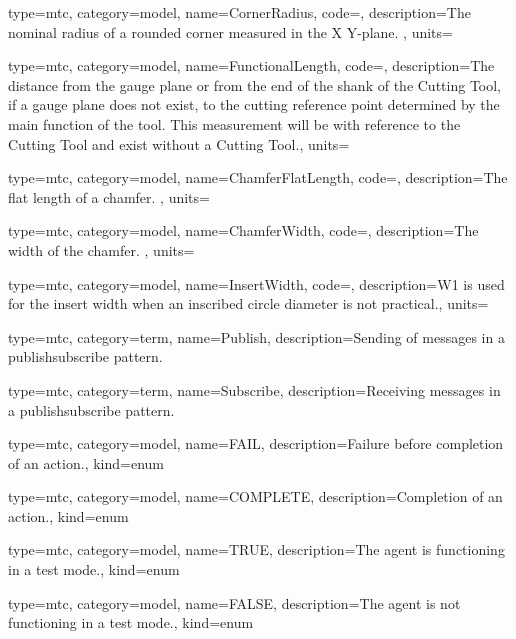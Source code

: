 {
  type=mtc,
  category=model,
  name={CornerRadius},
  code=,
  description={The nominal radius of a rounded corner measured in the X Y-plane. },
  units=
}


{
  type=mtc,
  category=model,
  name={FunctionalLength},
  code=,
  description={The distance from the gauge plane or from the end of the shank of the Cutting Tool, if a gauge plane does not exist, to the cutting reference point determined by the main function of the tool. This measurement will be with reference to the Cutting Tool and \MUSTNOT exist without a Cutting Tool.},
  units=
}


{
  type=mtc,
  category=model,
  name={ChamferFlatLength},
  code=,
  description={The flat length of a chamfer. },
  units=
}


{
  type=mtc,
  category=model,
  name={ChamferWidth},
  code=,
  description={The width of the chamfer. },
  units=
}


{
  type=mtc,
  category=model,
  name={InsertWidth},
  code=,
  description={W1 is used for the insert width when an inscribed circle diameter is not practical.},
  units=
}


{
  type=mtc,
  category=term,
  name={Publish},
  description={Sending of messages in a \gls{publishsubscribe} pattern.}
}


{
  type=mtc,
  category=term,
  name={Subscribe},
  description={Receiving messages in a \gls{publishsubscribe} pattern.}
}



{
  type=mtc,
  category=model,
  name={FAIL},
  description={Failure before completion of an action.},
  kind={enum}
}


{
  type=mtc,
  category=model,
  name={COMPLETE},
  description={Completion of an action.},
  kind={enum}
}

{
  type=mtc,
  category=model,
  name={TRUE},
  description={The \gls{agent} is functioning in a test mode.},
  kind={enum}
}

{
  type=mtc,
  category=model,
  name={FALSE},
  description={The \gls{agent} is not functioning in a test mode.},
  kind={enum}
}

